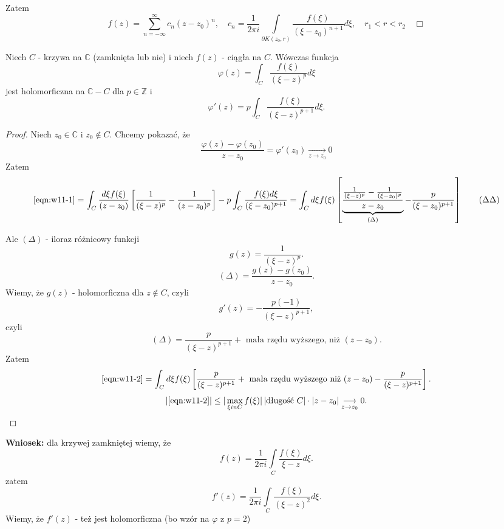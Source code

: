 \documentclass[../main.tex]{subfiles}
\begin{document}
 Zatem
 \[
     f(z) = \sum_{n=-\infty}^{\infty} c_n (z-z_0)^n, \quad c_n = \frac{1}{2\pi i} \int\limits_{\partial K(z_0,r)} \frac{f(\xi)}{(\xi - z_0)^{n+1}}d\xi, \quad r_1<r<r_2 \quad\Box
 \]

 \begin{tw}
     Niech $C$ - krzywa na $\mathbb{C}$ (zamknięta lub nie) i niech $f(z)$ - ciągła na $C$. Wówczas funkcja
     \[
         \varphi(z) = \int_C \frac{f(\xi)}{(\xi - z)^p}d\xi
     \]
     jest holomorficzna na $\mathbb{C}-C$ dla $p\in \mathbb{Z}$ i
     \[
         \varphi'(z) = p\int_C \frac{f(\xi)}{(\xi - z)^{p+1}}d\xi
     .\]
 \end{tw}
 \begin{proof}
     Niech $z_0\in\mathbb{C}$ i $z_0\not\in C$. Chcemy pokazać, że
     \begin{equation}
         \label{eqn:w11-1}
         \frac{\varphi(z) - \varphi(z_0)}{z-z_0} = \varphi'(z_0) \underset{z \to z_0}{\longrightarrow} 0 \tag{*}
     \end{equation}
 Zatem
 \begin{equation}
     \label{eqn:w11-2}
     \eqref{eqn:w11-1} = \int_C \frac{d\xi f(\xi)}{(z-z_0)}\left[ \frac{1}{(\xi - z)^p} - \frac{1}{(z-z_0)^p} \right] - p\int_C \frac{f(\xi) d\xi}{(\xi - z_0)^{p+1}} = \int_C d\xi f(\xi) \left[ \underbrace{\frac{\frac{1}{(\xi - z)^p} - \frac{1}{(\xi - z_0)^p}}{z-z_0}}_{(\Delta)} - \frac{p}{(\xi - z_0)^{p+1}} \right] \tag{$\Delta\Delta$}
 \end{equation}

 Ale $(\Delta)$ - iloraz różnicowy funkcji \[
     g(z) = \frac{1}{(\xi - z)^p}
 .\]
 \[
     (\Delta) = \frac{g(z) - g(z_0)}{z-z_0}
 .\]
 Wiemy, że $g(z)$ - holomorficzna dla $z\not\in C$, czyli
      \[
          g'(z) = -\frac{p(-1)}{(\xi - z)^{p+1}}
     ,\]
 czyli
     \[
         (\Delta) = \frac{p}{(\xi - z)^{p+1}} + \text{ mała rzędu wyższego, niż }(z-z_0)
     .\]
 Zatem
     \[
         \eqref{eqn:w11-2} = \int_C d\xi f(\xi) \left[ \frac{p}{(\xi - z)^{p+1}} + \text{ mała rzędu wyższego niż }(z-z_0) - \frac{p}{(\xi - z)^{p+1}} \right]
     .\]
 \[
     |\eqref{eqn:w11-2}| \le |\max\limits_{\xi in C} f(\xi)|\left| \text{długość }C\right|\cdot  |z-z_0| \underset{z\to z_0}{\longrightarrow} 0
 .\]
 \end{proof}
 \textbf{Wniosek:} dla krzywej zamkniętej wiemy, że
 \[
     f(z) = \frac{1}{2\pi i}\int\limits_C \frac{f(\xi)}{\xi - z}d\xi
 .\]
 zatem
 \[
     f'(z) = \frac{1}{2\pi i}\int\limits_C \frac{f(\xi)}{(\xi - z)^2}d\xi
 .\]
 Wiemy, że $f'(z)$ - też jest holomorficzna (bo wzór na $\varphi$ z $p = 2$)
\end{document}
